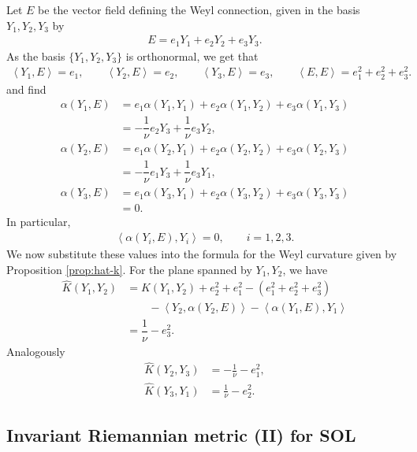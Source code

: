 \documentclass[12pt]{article}
\begin{document}
\noindent Let $E$ be the vector field defining the Weyl connection, given in the basis $Y_1,Y_2,Y_3$ by
\begin{align*}
    E=e_1Y_1+e_2Y_2+e_3Y_3.
\end{align*}
As the basis $\{Y_1,Y_2,Y_3\}$ is orthonormal, we get that
\begin{align*}
    \left\langle Y_1,E \right\rangle=e_1,
    \qquad
    \left\langle Y_2,E \right\rangle=e_2,
    \qquad
    \left\langle Y_3,E \right\rangle=e_3,
    \qquad
    \left\langle E,E \right\rangle=e_1^2+e_2^2+e_3^2.
\end{align*}
and find
\begin{align*}
    \nonumber \alpha(Y_1,E)
    &=e_1\alpha(Y_1,Y_1)+e_2\alpha(Y_1,Y_2)+e_3\alpha(Y_1,Y_3) \\
    &=-\dfrac{1}{\nu}e_2Y_3+\dfrac{1}{\nu}e_3Y_2,
\end{align*}
\begin{align*}
    \nonumber \alpha(Y_2,E)
    &=e_1\alpha(Y_2,Y_1)+e_2\alpha(Y_2,Y_2)+e_3\alpha(Y_2,Y_3) \\
    &=-\dfrac{1}{\nu}e_1Y_3+\dfrac{1}{\nu}e_3Y_1,
\end{align*}
\begin{align*}
    \nonumber \alpha(Y_3,E)
    &=e_1\alpha(Y_3,Y_1)+e_2\alpha(Y_3,Y_2)+e_3\alpha(Y_3,Y_3) \\
    &=0.
\end{align*}
In particular,
\begin{align*}
    \left\langle \alpha(Y_i,E),Y_i \right\rangle=0,
    \qquad i=1,2,3.
\end{align*}
We now substitute these values into the formula for the Weyl curvature given by Proposition \ref{prop:hat-k}. For the plane spanned by $Y_1,Y_2$, we have
\begin{align*}
    \nonumber \widehat{K}(Y_1,Y_2)
    &=K(Y_1,Y_2)+e_2^2+e_1^2-(e_1^2+e_2^2+e_3^2) \\
    &\qquad -\left\langle Y_2,\alpha(Y_2,E) \right\rangle
    -\left\langle \alpha(Y_1,E),Y_1 \right\rangle \\
    &=\dfrac{1}{\nu}-e_3^2.
\end{align*}
Analogously
\begin{align*}
    \widehat{K}(Y_2,Y_3)
    &=-\frac{1}{\nu}-e_1^2, \\
    \widehat{K}(Y_3,Y_1) &= \frac{1}{\nu}-e_2^2.
\end{align*}

\subsection{Invariant Riemannian metric (II) for SOL}
\end{document}
